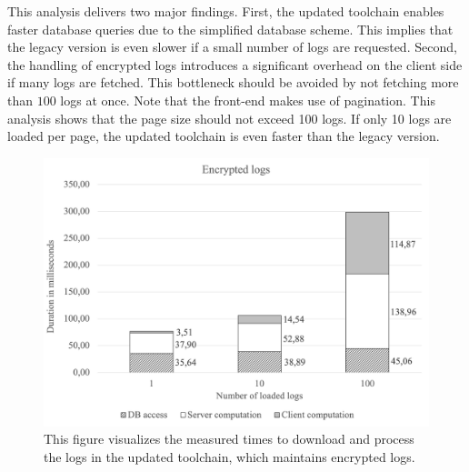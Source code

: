 \documentclass[../main.tex]{subfiles}
\begin{document}
This analysis delivers two major findings.
First, the updated toolchain enables faster database queries due to the simplified database scheme.
This implies that the legacy version is even slower if a small number of logs are requested.
Second, the handling of encrypted logs introduces a significant overhead on the client side if many logs are fetched.
This bottleneck should be avoided by not fetching more than $100$ logs at once.
Note that the front-end makes use of pagination.
This analysis shows that the page size should not exceed 100 logs.
If only 10 logs are loaded per page, the updated toolchain is even faster than the legacy version.

\begin{figure}[ht]
    \includegraphics[scale=0.63]{../img/07/encrypted.png}
    \centering
    \caption[Measurements updated toolchain]{This figure visualizes the measured times to download and process the logs in the updated toolchain, which maintains encrypted logs.}
    \label{fig:perf-encrypted}
\end{figure}
\end{document}
